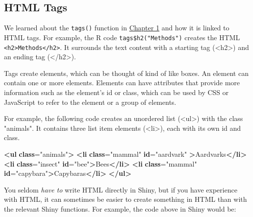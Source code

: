 \documentclass[
  oneside]{book}
\newenvironment{Shaded}{\begin{snugshade}}{\end{snugshade}}
\newcommand{\ErrorTok}[1]{\textcolor[rgb]{0.64,0.00,0.00}{\textbf{#1}}}
\newcommand{\KeywordTok}[1]{\textcolor[rgb]{0.13,0.29,0.53}{\textbf{#1}}}
\newcommand{\NormalTok}[1]{#1}
\newcommand{\OtherTok}[1]{\textcolor[rgb]{0.56,0.35,0.01}{#1}}
\newcommand{\StringTok}[1]{\textcolor[rgb]{0.31,0.60,0.02}{#1}}
\begin{document}
\hypertarget{html-tags}{%
\subsection{HTML Tags}\label{html-tags}}

We learned about the \texttt{tags}\texttt{()} function in \protect\hyperlink{tags}{Chapter 1} and how it is linked to HTML tags. For example, the R code \texttt{tags\$h2("Methods")} creates the HTML \texttt{\textless{}h2\textgreater{}Methods\textless{}/h2\textgreater{}}. It surrounds the text content with a starting tag (\NormalTok{<h2>}) and an ending tag (\NormalTok{</h2>}).

Tags create elements, which can be thought of kind of like boxes. An element can contain one or more elements. Elements can have attributes that provide more information such as the element's \NormalTok{id} or \NormalTok{class}, which can be used by CSS or JavaScript to refer to the element or a group of elements.

For example, the following code creates an unordered list (\NormalTok{<ul>}) with the \NormalTok{class} \StringTok{"animals"}. It contains three list item elements (\NormalTok{<li>}), each with its own \NormalTok{id} and \NormalTok{class}.

\begin{Shaded}
\begin{Highlighting}[]
\KeywordTok{\textless{}ul} \ErrorTok{class}\OtherTok{=}\StringTok{"animals"}\KeywordTok{\textgreater{}}
    \KeywordTok{\textless{}li} \ErrorTok{class}\OtherTok{=}\StringTok{"mammal"} \ErrorTok{id}\OtherTok{=}\StringTok{"aardvark"} \KeywordTok{\textgreater{}}\NormalTok{Aardvarks}\KeywordTok{\textless{}/li\textgreater{}}
    \KeywordTok{\textless{}li} \ErrorTok{class}\OtherTok{=}\StringTok{"insect"} \ErrorTok{id}\OtherTok{=}\StringTok{"bee"}\KeywordTok{\textgreater{}}\NormalTok{Bees}\KeywordTok{\textless{}/li\textgreater{}}
    \KeywordTok{\textless{}li} \ErrorTok{class}\OtherTok{=}\StringTok{"mammal"} \ErrorTok{id}\OtherTok{=}\StringTok{"capybara"}\KeywordTok{\textgreater{}}\NormalTok{Capybaras}\KeywordTok{\textless{}/li\textgreater{}}
\KeywordTok{\textless{}/ul\textgreater{}}
\end{Highlighting}
\end{Shaded}

You seldom \emph{have to} write HTML directly in Shiny, but if you have experience with HTML, it can sometimes be easier to create something in HTML than with the relevant Shiny functions. For example, the code above in Shiny would be:
\end{document}
